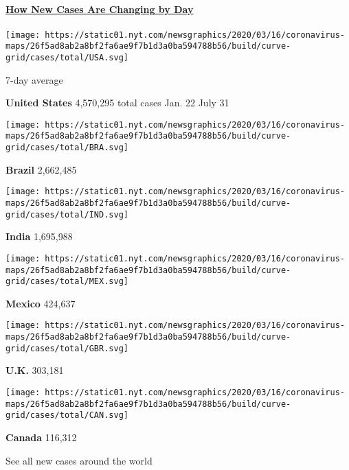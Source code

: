 \subsection{}

\hypertarget{how-new-cases-are-changing-by-day}{%
\paragraph{\texorpdfstring{\href{https://www.nytimes.com/interactive/2020/world/coronavirus-maps.html}{How
New Cases Are Changing by
Day}}{How New Cases Are Changing by Day}}\label{how-new-cases-are-changing-by-day}}

\texttt{[image: https://static01.nyt.com/newsgraphics/2020/03/16/coronavirus-maps/26f5ad8ab2a8bf2fa6ae9f7b1d3a0ba594788b56/build/curve-grid/cases/total/USA.svg]}

7-day average

\textbf{United States} 4,570,295 total cases Jan. 22 July 31

\texttt{[image: https://static01.nyt.com/newsgraphics/2020/03/16/coronavirus-maps/26f5ad8ab2a8bf2fa6ae9f7b1d3a0ba594788b56/build/curve-grid/cases/total/BRA.svg]}

\textbf{Brazil} 2,662,485

\texttt{[image: https://static01.nyt.com/newsgraphics/2020/03/16/coronavirus-maps/26f5ad8ab2a8bf2fa6ae9f7b1d3a0ba594788b56/build/curve-grid/cases/total/IND.svg]}

\textbf{India} 1,695,988

\texttt{[image: https://static01.nyt.com/newsgraphics/2020/03/16/coronavirus-maps/26f5ad8ab2a8bf2fa6ae9f7b1d3a0ba594788b56/build/curve-grid/cases/total/MEX.svg]}

\textbf{Mexico} 424,637

\texttt{[image: https://static01.nyt.com/newsgraphics/2020/03/16/coronavirus-maps/26f5ad8ab2a8bf2fa6ae9f7b1d3a0ba594788b56/build/curve-grid/cases/total/GBR.svg]}

\textbf{U.K.} 303,181

\texttt{[image: https://static01.nyt.com/newsgraphics/2020/03/16/coronavirus-maps/26f5ad8ab2a8bf2fa6ae9f7b1d3a0ba594788b56/build/curve-grid/cases/total/CAN.svg]}

\textbf{Canada} 116,312

\href{https://www.nytimes.com/interactive/2020/world/coronavirus-maps.html}{}

See all new cases around the world

\href{https://www.nytimes.com/2020/07/31/world/coronavirus-covid-19.html}{}

